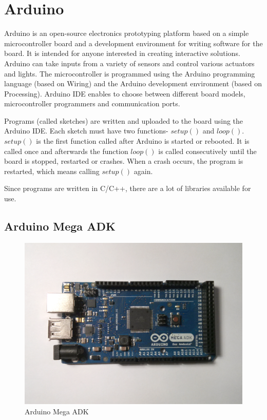 \section{Arduino}

Arduino \cite{arduinoHome} is an open-source electronics prototyping platform based on a simple microcontroller board and a development environment for writing software for the board. It is intended for anyone interested in creating interactive solutions. Arduino can take inputs from a variety of sensors and control various actuators and lights. The microcontroller is programmed using the Arduino programming language (based on Wiring) and the Arduino development environment (based on Processing). Arduino IDE enables to choose between different board models, microcontroller programmers and communication ports. 

Programs (called sketches) are written and uploaded to the board using the Arduino IDE. Each sketch must have two functions- $setup()$ and $loop()$. $setup()$ is the first function called after Arduino is started or rebooted. It is called once and afterwards the function $loop()$ is called consecutively until the board is stopped, restarted or crashes. When a crash occurs, the program is restarted, which means calling $setup()$ again. 

Since programs are written in C/C++, there are a lot of libraries available for use. 

\subsection{Arduino Mega ADK}

\begin{figure}[h!]
\centering
\includegraphics[scale=0.58]{2/figures/mega_adk.pdf}
\caption{Arduino Mega ADK}
\label{mega_adk}
\end{figure}

